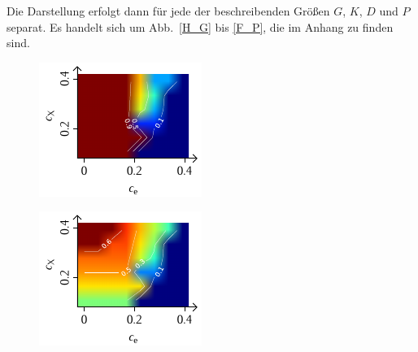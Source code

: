 \documentclass[a4paper, 10pt, twoside, openany]{book} %
\begin{document}
Die Darstellung erfolgt dann für jede der beschreibenden Größen $G$, $K$, $D$ und $P$ separat. Es handelt sich um Abb.~\ref{H_G} bis \ref{F_P}, die im Anhang zu finden sind.

\begin{figure}[b]
    \begin{minipage}[t]{0.31\textwidth}
        \includegraphics[width=\textwidth]{Abbildungen/Phasendiagramme/Exakt/H_G.pdf}
        \label{HGx}
    \end{minipage}
    \hfill
    \begin{minipage}[t]{0.31\textwidth}
        \includegraphics[width=\textwidth]{Abbildungen/Phasendiagramme/Exakt/H_K.pdf}

\end{minipage}
\end{figure}
\end{document}
